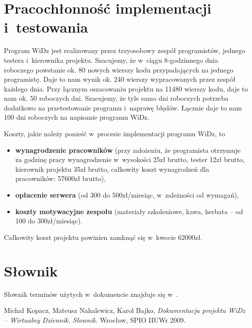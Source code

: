 \documentclass[12pt,leqno,twoside]{mwart}
\begin{document}
\section{Pracochłonność implementacji i~testowania}
\noindent Program WiDz jest realizowany przez trzyosobowy zespół programistów, jednego testera i~kierownika projektu. Szacujemy, że w~ciągu 8-godzinnego dnia roboczego powstanie ok. 80 nowych wierszy kodu przypadających na jednego programistę. Daje to nam wynik ok. 240 wierszy wypracowanych przez zespół każdego dnia. Przy łącznym oszacowaniu projektu na 11480 wierszy kodu, daje to nam ok. 50 roboczych dni. Szacujemy, że tyle samo dni roboczych potrzeba dodatkowo na przetestowanie programu i~naprawę błędów. Łącznie daje to nam 100 dni roboczych na napisanie programu WiDz.

Koszty, jakie należy ponieść w~procesie implementacji programu WiDz, to
\begin{itemize}
\item \textbf{wynagrodzenie pracowników} (przy założeniu, że programista otrzymuje za godzinę pracy wynagrodzenie w~wysokości 25zł brutto, tester 12zł brutto, kierownik projektu 35zł brutto, całkowity koszt wynagrodzeń dla pracowników: 57600zł brutto),
\item \textbf{opłacenie serwera} (od 300 do 500zł/miesiąc, w~zależności od wymagań),
\item \textbf{koszty motywacyjne zespołu} (materiały szkoleniowe, kawa, herbata -- od 100 do 300zł/miesiąc).
\end{itemize}
Całkowity koszt projektu powinien zamknąć się w~kwocie 62000zł.

\section{Słownik}
\noindent Słownik terminów użytych w~dokumencie znajduje się w~\cite{SLO}.

\begin{thebibliography}{99}
 Michał Kopacz, Mateusz Nahalewicz, Karol Bajko, {\it Dokumentacja projektu WiDz -- Wirtualny Dziennik. Słownik}. Wrocław, SPIO IIUWr 2009.
\end{thebibliography}
\end{document}

